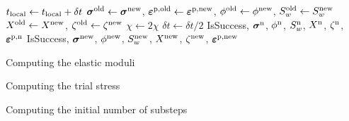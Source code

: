 \begin{breakablealgorithm}
\begin{algorithmic}[1]
           \State $ t_{\text{local}} \leftarrow t_{\text{local}} + \delta t$
           \State $\boldsymbol{\sigma}^{\text{old}} \leftarrow \boldsymbol{\sigma}^{\text{new}}$, $\boldsymbol{\varepsilon}^{\text{p},\text{old}} \leftarrow \boldsymbol{\varepsilon}^{\text{p},\text{new}}$,
                  $\phi^{\text{old}} \leftarrow \phi^{\text{new}}$, $S_w^{\text{old}} \leftarrow S_w^{\text{new}}$ 
                  $X^{\text{old}} \leftarrow X^{\text{new}}$, $\zeta^{\text{old}} \leftarrow \zeta^{\text{new}}$ 
        \Else
           \State $\chi \leftarrow 2\chi$
           \State $\delta t \leftarrow \delta t/2$
             \State \Return IsSuccess, $\boldsymbol{\sigma}^{\text{n}}$, $\phi^{\text{n}}$, $S_w^{\text{n}}$, $X^{\text{n}}$, $\zeta^{\text{n}}$,
                                            $\boldsymbol{\varepsilon}^{\text{p},\text{n}}$ 
           \EndIf
        \EndIf
      \State \Return IsSuccess, $\boldsymbol{\sigma}^{\text{new}}$, $\phi^{\text{new}}$, $S_w^{\text{new}}$, $X^{\text{new}}$, $\zeta^{\text{new}}$,
                                            $\boldsymbol{\varepsilon}^{\text{p},\text{new}}$ 
      
    \EndProcedure
  \end{algorithmic}
\end{breakablealgorithm}

\begin{breakablealgorithm}
  \caption{Computing the elastic moduli}
  \begin{algorithmic}[1]
    \EndProcedure
  \end{algorithmic}
\end{breakablealgorithm}

\begin{breakablealgorithm}
  \caption{Computing the trial stress}
  \begin{algorithmic}[1]
    \EndProcedure
  \end{algorithmic}
\end{breakablealgorithm}

\begin{breakablealgorithm}
  \caption{Computing the initial number of substeps}
  \begin{algorithmic}[1]
    \EndProcedure
  \end{algorithmic}
\end{breakablealgorithm}

